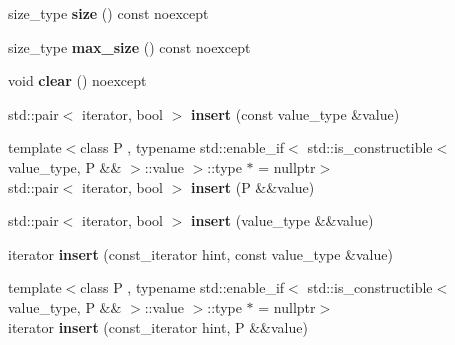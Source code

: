 \begin{DoxyCompactItemize}
\mbox{\label{classtsl_1_1ordered__map_afa5e8225aa168f0a9ca98d3469cb259a}} 
size\+\_\+type {\bfseries size} () const noexcept
\item 
\mbox{\label{classtsl_1_1ordered__map_ae2c8e9613ce6b87afa3b404bc426c673}} 
size\+\_\+type {\bfseries max\+\_\+size} () const noexcept
\item 
\mbox{\label{classtsl_1_1ordered__map_ac758eed79d23f37b0e5590bff5f8053d}} 
void {\bfseries clear} () noexcept
\item 
\mbox{\label{classtsl_1_1ordered__map_a4e3c1f96bb1e90009899bfa316aac374}} 
std\+::pair$<$ iterator, bool $>$ {\bfseries insert} (const value\+\_\+type \&value)
\item 
\mbox{\label{classtsl_1_1ordered__map_a78dca6b0002ee5aee50c1814eade374b}} 
{\footnotesize template$<$class P , typename std\+::enable\+\_\+if$<$ std\+::is\+\_\+constructible$<$ value\+\_\+type, P \&\& $>$\+::value $>$\+::type $\ast$  = nullptr$>$ }\\std\+::pair$<$ iterator, bool $>$ {\bfseries insert} (P \&\&value)
\item 
\mbox{\label{classtsl_1_1ordered__map_af26932f1e49de4500bf55fb06b861e71}} 
std\+::pair$<$ iterator, bool $>$ {\bfseries insert} (value\+\_\+type \&\&value)
\item 
\mbox{\label{classtsl_1_1ordered__map_a314ade9cf907575464ec85a0b001c04a}} 
iterator {\bfseries insert} (const\+\_\+iterator hint, const value\+\_\+type \&value)
\item 
\mbox{\label{classtsl_1_1ordered__map_ad4c70f8df8e406b4e930a24cd740ca65}} 
{\footnotesize template$<$class P , typename std\+::enable\+\_\+if$<$ std\+::is\+\_\+constructible$<$ value\+\_\+type, P \&\& $>$\+::value $>$\+::type $\ast$  = nullptr$>$ }\\iterator {\bfseries insert} (const\+\_\+iterator hint, P \&\&value)
\item 
\mbox{\label{classtsl_1_1ordered__map_a8aec833e24e030b6c1bd5fd8056bab52}} 

\end{DoxyCompactItemize}
